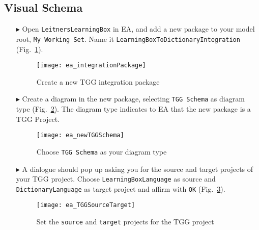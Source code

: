 \newpage
\hypertarget{schema vis}{}
\subsection{Visual Schema}
\visHeader

\begin{itemize}

\item[$\blacktriangleright$] Open \texttt{LeitnersLearningBox} in EA, and add a new package to your model root, \texttt{My Working Set}. Name it
\texttt{Learning\-Box\-To\-Dictionary\-Integration} (Fig.~\ref{fig:intgPackage}).

\vspace{0.5cm}

\begin{figure}[htbp]
\begin{center}
  \texttt{[image: ea\_integrationPackage]}
  \caption{Create a new TGG integration package}  
  \label{fig:intgPackage}
\end{center}
\end{figure}

\item[$\blacktriangleright$] Create a diagram in the new package, selecting \texttt{TGG Schema} as diagram type (Fig.~\ref{fig:tgg_diagram_type}). The diagram
type indicates to EA that the new package is a TGG Project.

\vspace{0.5cm}

\begin{figure}[htbp]
\begin{center}
  \texttt{[image: ea\_newTGGSchema]}
  \caption{Choose \texttt{TGG Schema} as your diagram type}  
  \label{fig:tgg_diagram_type}
\end{center}
\end{figure}

\item[$\blacktriangleright$] A dialogue should pop up asking you for the source and target projects of your TGG project.  Choose
\texttt{Learning\-Box\-Language} as source and \texttt{Dictionary\-Language} as target project and affirm with \texttt{OK} (Fig.~\ref{fig:select_source_target}).

\vspace{0.5cm}

\begin{figure}[htbp]
\begin{center}
  \texttt{[image: ea\_TGGSourceTarget]}
  \caption{Set the \texttt{source} and \texttt{target} projects for the TGG project}  
  \label{fig:select_source_target}
\end{center}
\end{figure}


\end{itemize}
